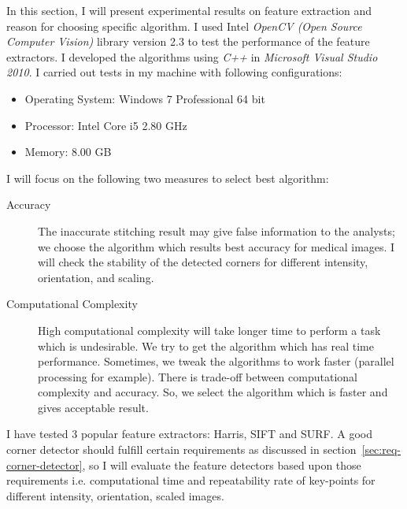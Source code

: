 In this section, I will present experimental results on feature extraction and reason for choosing specific algorithm. I used Intel \emph{OpenCV (Open Source Computer Vision)} library version 2.3 to test the performance of the feature extractors. I developed the algorithms using \emph{C++} in \emph{Microsoft Visual Studio 2010}. I carried out tests in my machine with following configurations:
\begin{itemize}
	\item Operating System: Windows 7 Professional 64 bit
	\item Processor: Intel Core i5 2.80 GHz
	\item Memory: 8.00 GB 	
\end{itemize}

I will focus on the following two measures to select best algorithm:
\begin{description}
\item[Accuracy] The inaccurate stitching result may give false information to the analysts; we choose the algorithm which results best accuracy for medical images. I will check the stability of the detected corners for different intensity, orientation, and scaling.
\item[Computational Complexity] High computational complexity will take longer time to perform a task which is undesirable. We try to get the algorithm which has real time performance. Sometimes, we tweak the algorithms to work faster (parallel processing for example). There is trade-off between computational complexity and accuracy. So, we select the algorithm which is faster and gives acceptable result. 
\end{description}

\noindent I have tested 3 popular feature extractors: Harris, SIFT and SURF. A good corner detector should fulfill certain requirements as discussed in section~\ref{sec:req-corner-detector}, so I will evaluate the feature detectors based upon those requirements i.e. computational time and repeatability rate of key-points for different intensity, orientation, scaled images.\\

